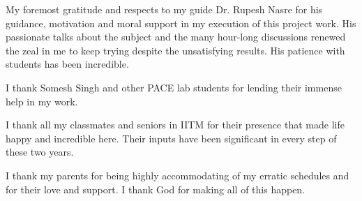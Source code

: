 \acknowledgements
My foremost gratitude and respects to my guide Dr. Rupesh Nasre for his guidance, motivation and moral support in my execution of this project work. His passionate talks about the subject and the many hour-long discussions renewed the zeal in me to keep trying despite the unsatisfying results. His patience with students has been incredible.

I thank Somesh Singh and other PACE lab students for lending their immense help in my work. 

I thank all my classmates and seniors in IITM for their presence that made life happy and incredible here. Their inputs have been significant in every step of these two years.

I thank my parents for being highly accommodating of my erratic schedules and for their love and support. I thank God for making all of this happen.
